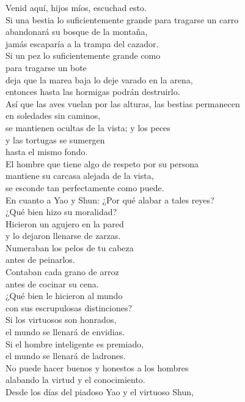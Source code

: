 \documentclass[hidelinks]{memoir}
\begin{document}
	Venid aquí, hijos míos, escuchad esto.\\
	Si una bestia lo suficientemente grande para tragarse un carro\\
	abandonará su bosque de la montaña,\\
	jamás escaparía a la trampa del cazador.\\
	Si un pez lo suficientemente grande como\\
	para tragarse un bote\\
	deja que la marea baja lo deje varado en la arena,\\
	entonces hasta las hormigas podrán destruirlo.\\
	Así que las aves vuelan por las alturas, las bestias permanecen\\
	en soledades sin caminos,\\
	se mantienen ocultas de la vista; y los peces\\
	y las tortugas se sumergen\\
	hasta el mismo fondo.\\
	El hombre que tiene algo de respeto por su persona\\
	mantiene su carcasa alejada de la vista,\\
	se esconde tan perfectamente como puede.\\
	En cuanto a Yao y Shun: ¿Por qué alabar a tales reyes?\\
	¿Qué bien hizo su moralidad?\\
	Hicieron un agujero en la pared\\
	y lo dejaron llenarse de zarzas.\\
	Numeraban los pelos de tu cabeza\\
	antes de peinarlos.\\
	Contaban cada grano de arroz\\
	antes de cocinar su cena.\\
	¿Qué bien le hicieron al mundo\\
	con sus escrupulosas distinciones?\\
	Si los virtuosos son honrados,\\
	el mundo se llenará de envidias.\\
	Si el hombre inteligente es premiado,\\
	el mundo se llenará de ladrones.\\
	No puede hacer buenos y honestos a los hombres\\
	alabando la virtud y el conocimiento.\\
	Desde los días del piadoso Yao y el virtuoso Shun,\\
\end{document}
